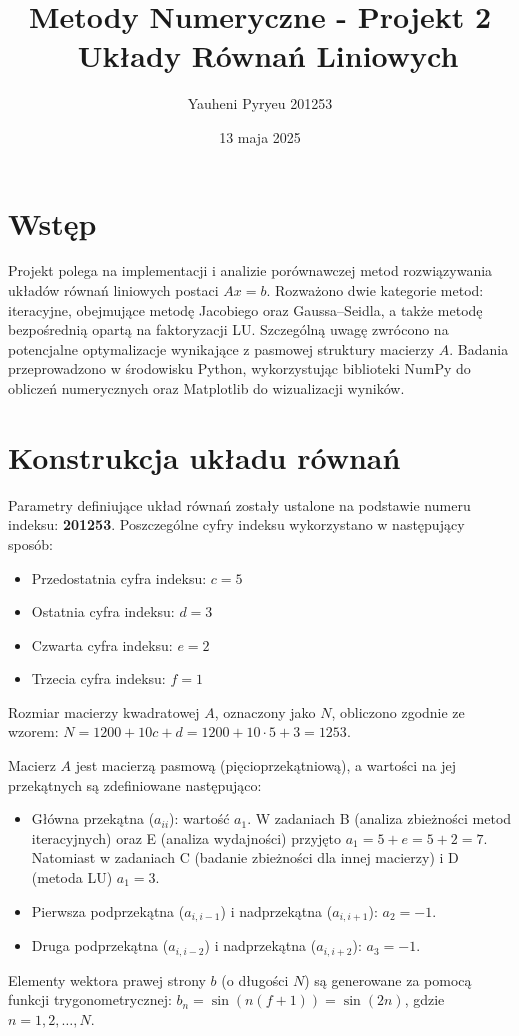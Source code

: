 \documentclass[a4paper, 11pt]{article}
\title{Metody Numeryczne - Projekt 2 \ Układy Równań Liniowych}
\author{Yauheni Pyryeu 201253}
\date{13 maja 2025}
\begin{document}
\maketitle

\section{Wstęp}
Projekt polega na implementacji i analizie porównawczej metod rozwiązywania układów równań liniowych postaci $Ax = b$. Rozważono dwie kategorie metod: iteracyjne, obejmujące metodę Jacobiego oraz Gaussa–Seidla, a także metodę bezpośrednią opartą na faktoryzacji LU. Szczególną uwagę zwrócono na potencjalne optymalizacje wynikające z pasmowej struktury macierzy $A$. Badania przeprowadzono w środowisku Python, wykorzystując biblioteki NumPy do obliczeń numerycznych oraz Matplotlib do wizualizacji wyników.

\section{Konstrukcja układu równań}
Parametry definiujące układ równań zostały ustalone na podstawie numeru indeksu: \textbf{201253}. Poszczególne cyfry indeksu wykorzystano w następujący sposób:
\begin{itemize}
    \item Przedostatnia cyfra indeksu: $c = 5$
    \item Ostatnia cyfra indeksu: $d = 3$
    \item Czwarta cyfra indeksu: $e = 2$
    \item Trzecia cyfra indeksu: $f = 1$
\end{itemize}
Rozmiar macierzy kwadratowej $A$, oznaczony jako $N$, obliczono zgodnie ze wzorem: $N = 1200 + 10c + d = 1200 + 10 \cdot 5 + 3 = 1253$.

Macierz $A$ jest macierzą pasmową (pięcioprzekątniową), a wartości na jej przekątnych są zdefiniowane następująco:
\begin{itemize}
    \item Główna przekątna ($a_{ii}$): wartość $a_1$. W zadaniach B (analiza zbieżności metod iteracyjnych) oraz E (analiza wydajności) przyjęto $a_1 = 5 + e = 5 + 2 = 7$. Natomiast w zadaniach C (badanie zbieżności dla innej macierzy) i D (metoda LU) $a_1 = 3$.
    \item Pierwsza podprzekątna ($a_{i, i-1}$) i nadprzekątna ($a_{i, i+1}$): $a_2 = -1$.
    \item Druga podprzekątna ($a_{i, i-2}$) i nadprzekątna ($a_{i, i+2}$): $a_3 = -1$.
\end{itemize}
Elementy wektora prawej strony $b$ (o długości $N$) są generowane za pomocą funkcji trygonometrycznej: $b_n = \sin(n(f+1)) = \sin(2n)$, gdzie $n = 1, 2, \dots, N$.
\end{document}
